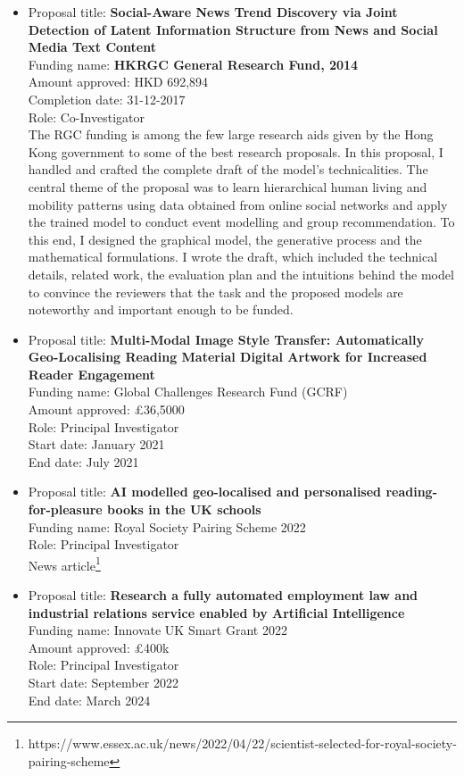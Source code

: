 \documentclass[margin]{res}
\begin{document}
\begin{resume}
\begin{itemize}
\item Proposal title: \textbf{Social-Aware News Trend Discovery via Joint Detection of Latent Information Structure from News
and Social Media Text Content}\\
Funding name: \textbf{HKRGC General Research Fund, 2014}\\
Amount approved: HKD 692,894 \\
Completion date: 31-12-2017 \\
Role: Co-Investigator \\
The RGC funding is among the few large research aids given by the Hong Kong government to some of the best research proposals. In this proposal, I handled and crafted the complete draft of the model's technicalities. The central theme of the proposal was to learn hierarchical human living and mobility patterns using data obtained from online social networks and apply the trained model to conduct event modelling and group recommendation. To this end, I designed the graphical model, the generative process and the mathematical formulations. I wrote the draft, which included the technical details, related work, the evaluation plan and the intuitions behind the model to convince the reviewers that the task and the proposed models are noteworthy and important enough to be funded.

\item Proposal title: \textbf{Multi-Modal Image Style Transfer: Automatically Geo-Localising Reading Material Digital Artwork for Increased Reader Engagement} \\
Funding name: Global Challenges Research Fund (GCRF) \\
Amount approved: \pounds36,5000 \\
Role: Principal Investigator \\
Start date: January 2021 \\
End date: July 2021

\item Proposal title: \textbf{AI modelled geo-localised and personalised reading-for-pleasure books in the UK schools} \\
Funding name: Royal Society Pairing Scheme 2022 \\
Role: Principal Investigator \\
News article\footnote{https://www.essex.ac.uk/news/2022/04/22/scientist-selected-for-royal-society-pairing-scheme}

\item Proposal title: \textbf{Research a fully automated employment law and industrial relations service enabled by Artificial Intelligence} \\
Funding name: Innovate UK Smart Grant 2022 \\
Amount approved: \pounds400k \\
Role: Principal Investigator \\
Start date: September 2022 \\
End date: March 2024
\end{itemize}


\end{resume}
\end{document}

